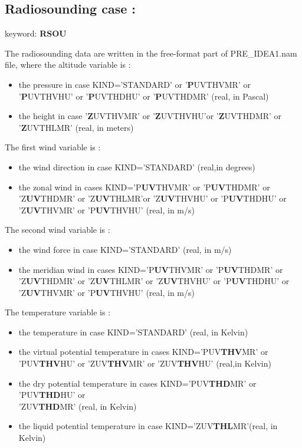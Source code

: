 \subsection{Radiosounding case :}

keyword: {\bf RSOU}

The radiosounding data are written in 
the free-format part of PRE\_IDEA1.nam file, where 
the  altitude variable is  :


\begin{itemize}
\item the pressure in case KIND='STANDARD' or '{\bf P}UVTHVMR' or 
'{\bf P}UVTHVHU' or '{\bf P}UVTHDHU' or '{\bf P}UVTHDMR' (real, in Pascal)
\item the height in case '{\bf Z}UVTHVMR' or 
'{\bf Z}UVTHVHU'or '{\bf Z}UVTHDMR' or '{\bf Z}UVTHLMR' (real, in meters)
\end{itemize}


The first wind  variable is  :


\begin{itemize}
\item the wind direction in case KIND='STANDARD' (real,in degrees)
\item the zonal wind in cases KIND='P{\bf UV}THVMR' or 'P{\bf UV}THDMR' or 
'Z{\bf UV}THDMR' or 'Z{\bf UV}THLMR'or 'Z{\bf UV}THVHU' or 'P{\bf UV}THDHU' or 'Z{\bf UV}THVMR' or
'P{\bf UV}THVHU' (real, in m/s)
\end{itemize}


The second wind  variable is  :


\begin{itemize}
\item the wind force in case KIND='STANDARD' (real, in m/s)
\item the meridian wind in cases KIND='P{\bf UV}THVMR' or 'P{\bf UV}THDMR' or 
'Z{\bf UV}THDMR' or 'Z{\bf UV}THLMR' or 'Z{\bf UV}THVHU' or 'P{\bf UV}THDHU' or 'Z{\bf UV}THVMR' or
'P{\bf UV}THVHU' (real, in m/s)
\end{itemize}


The temperature variable is  :


\begin{itemize}
\item the temperature in case KIND='STANDARD' (real, in Kelvin)
\item the virtual potential
temperature in cases KIND='PUV{\bf THV}MR' or 'PUV{\bf THV}HU' or
'ZUV{\bf THV}MR' or 'ZUV{\bf THV}HU' (real,in Kelvin)
\item  the dry potential temperature in cases
KIND='PUV{\bf THD}MR' or 'PUV{\bf THD}HU' or \\
'ZUV{\bf THD}MR' (real, in Kelvin)
\item the liquid potential temperature in case KIND='ZUV{\bf THL}MR'(real, in Kelvin)
\end{itemize}


